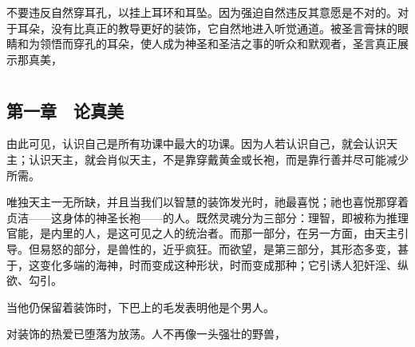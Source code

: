 不要违反自然穿耳孔，以挂上耳环和耳坠。因为强迫自然违反其意愿是不对的。对于耳朵，没有比真正的教导更好的装饰，它自然地进入听觉通道。被圣言膏抹的眼睛和为领悟而穿孔的耳朵，使人成为神圣和圣洁之事的听众和默观者，圣言真正展示那真美，\par



\section{}


\subsection{第一章　论真美}

由此可见，认识自己是所有功课中最大的功课。因为人若认识自己，就会认识天主；认识天主，就会肖似天主，不是靠穿戴黄金或长袍，而是靠行善并尽可能减少所需。\par

唯独天主一无所缺，并且当我们以智慧的装饰发光时，祂最喜悦；祂也喜悦那穿着贞洁——这身体的神圣长袍——的人。既然灵魂分为三部分：理智，即被称为推理官能，是内里的人，是这可见之人的统治者。而那一部分，在另一方面，由天主引导。但易怒的部分，是兽性的，近乎疯狂。而欲望，是第三部分，其形态多变，甚于，这变化多端的海神，时而变成这种形状，时而变成那种；它引诱人犯奸淫、纵欲、勾引。\par

\par

当他仍保留着装饰时，下巴上的毛发表明他是个男人。\par

\par

对装饰的热爱已堕落为放荡。人不再像一头强壮的野兽，\par

